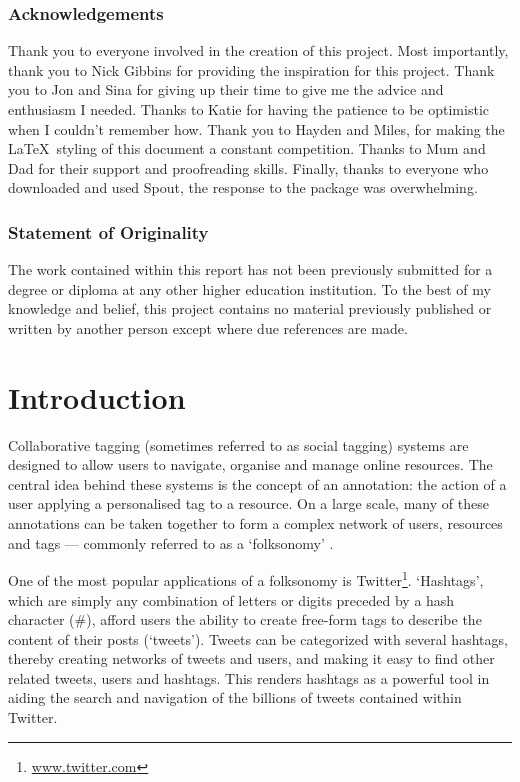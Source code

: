\documentclass[11pt,a4paper]{report}
\begin{document}
\tableofcontents

\pagebreak

\subsection*{Acknowledgements}
Thank you to everyone involved in the creation of this project. Most importantly, thank you to Nick Gibbins for providing the inspiration for this project. Thank you to Jon and Sina for giving up their time to give me the advice and enthusiasm I needed. Thanks to Katie for having the patience to be optimistic when I couldn't remember how. Thank you to Hayden and Miles, for making the \LaTeX\ styling of this document a constant competition. Thanks to Mum and Dad for their support and proofreading skills. Finally, thanks to everyone who downloaded and used Spout, the response to the package was overwhelming.

\subsection*{Statement of Originality}

The work contained within this report has not been previously submitted for a degree or diploma at any other higher education institution. To the best of my knowledge and belief, this project contains no material previously published or written by another person except where due references are made.

\pagebreak

\setcounter{page}{1}

\chapter{Introduction}
\label{chap:introduction}
Collaborative tagging (sometimes referred to as social tagging) systems are designed to allow users to navigate, organise and manage online resources. The central idea behind these systems is the concept of an annotation: the action of a user applying a personalised tag to a resource. On a large scale, many of these annotations can be taken together to form a complex network of users, resources and tags --- commonly referred to as a `folksonomy' \parencite{Xu:2008}.

One of the most popular applications of a folksonomy is Twitter\footnote{\url{www.twitter.com}}. `Hashtags', which are simply any combination of letters or digits preceded by a hash character (\#), afford users the ability to create free-form tags to describe the content of their posts (`tweets'). Tweets can be categorized with several hashtags, thereby creating networks of tweets and users, and making it easy to find other related tweets, users and hashtags. This renders hashtags as a powerful tool in aiding the search and navigation of the billions of tweets contained within Twitter.
\end{document}
